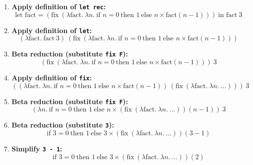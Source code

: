 \documentclass{article}
\begin{document}
\begin{enumerate}
    \item \textbf{Apply definition of \texttt{let rec}:}
    \begin{equation*}
    \text{let } \text{fact} = (\text{fix}\ (\lambda \text{fact}.\ \lambda n.\ \text{if } n = 0\ \text{then } 1\ \text{else } n \times \text{fact}(n - 1)))\ \text{in }\text{fact}\ 3
    \end{equation*}
    \item \textbf{Apply definition of \texttt{let}:}
    \begin{equation*}
    (\lambda \text{fact}.\ \text{fact}\ 3)\ \left( \text{fix}\ (\lambda \text{fact}.\ \lambda n.\ \text{if } n = 0\ \text{then } 1\ \text{else } n \times \text{fact}(n - 1)) \right)
    \end{equation*}
    \item \textbf{Beta reduction (substitute \texttt{fix F}):}
    \begin{equation*}
    \left( \text{fix}\ (\lambda \text{fact}.\ \lambda n.\ \text{if } n = 0\ \text{then } 1\ \text{else } n \times \text{fact}(n - 1)) \right)\ 3
    \end{equation*}
    \item \textbf{Apply definition of \texttt{fix}:}
    \begin{equation*}
    \left( (\lambda \text{fact}.\ \lambda n.\ \text{if } n = 0\ \text{then } 1\ \text{else } n \times \text{fact}(n - 1))\ \left( \text{fix}\ (\lambda \text{fact}.\ \lambda n.\ \ldots) \right) \right)\ 3
    \end{equation*}
    \item \textbf{Beta reduction (substitute \texttt{fix F}):}
    \begin{equation*}
    \left( \lambda n.\ \text{if } n = 0\ \text{then } 1\ \text{else } n \times \left( \text{fix}\ (\lambda \text{fact}.\ \lambda n.\ \ldots) \right)(n - 1) \right)\ 3
    \end{equation*}
    \item \textbf{Beta reduction (substitute \texttt{3}):}
    \begin{equation*}
    \text{if } 3 = 0\ \text{then } 1\ \text{else } 3 \times \left( \text{fix}\ (\lambda \text{fact}.\ \lambda n.\ \ldots) \right)(3 - 1)
    \end{equation*}
    \item \textbf{Simplify \texttt{3 - 1}:}
    \begin{equation*}
    \text{if } 3 = 0\ \text{then } 1\ \text{else } 3 \times \left( \text{fix}\ (\lambda \text{fact}.\ \lambda n.\ \ldots) \right)(2)

\end{equation*}
\end{enumerate}
\end{document}
